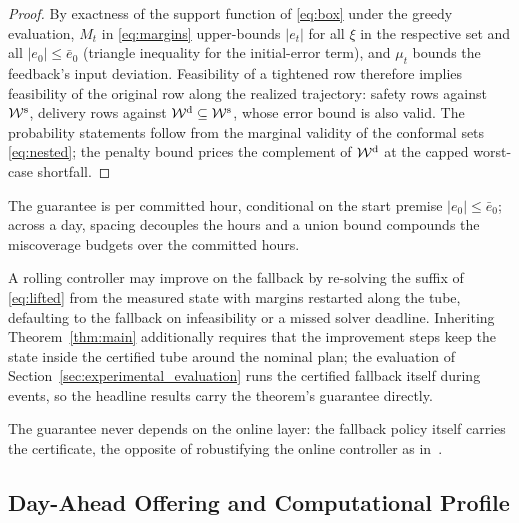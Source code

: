\begin{proof}
By exactness of the support function of \eqref{eq:box} under the greedy
evaluation, $M_t$ in \eqref{eq:margins} upper-bounds $|e_t|$ for all
$\xi$ in the respective set and all $|e_0|\le\bar e_0$ (triangle inequality
for the initial-error term), and $\mu_t$ bounds the feedback's input
deviation. Feasibility of a tightened row therefore implies feasibility of
the original row along the realized trajectory: safety rows against
$\mathcal{W}^{\mathrm{s}}$, delivery rows against $\mathcal{W}^{\mathrm{d}}\subseteq\mathcal{W}^{\mathrm{s}}$, whose error bound is
also valid. The probability statements follow from the marginal validity of
the conformal sets \eqref{eq:nested}; the penalty bound prices the
complement of $\mathcal{W}^{\mathrm{d}}$ at the capped worst-case shortfall.
\end{proof}

The guarantee is per committed hour, conditional on the start premise
$|e_0|\le\bar e_0$; across a day, spacing decouples the hours and a union
bound compounds the miscoverage budgets over the committed hours.

\begin{remark}\label{rem:mpc}
A rolling controller may improve on the fallback by re-solving the suffix of
\eqref{eq:lifted} from the measured state with margins restarted along the
tube, defaulting to the fallback on infeasibility or a missed solver
deadline. Inheriting Theorem~\ref{thm:main} additionally requires that the
improvement steps keep the state inside the certified tube around the
nominal plan; the evaluation of
Section~\ref{sec:experimental_evaluation} runs the certified fallback
itself during events, so the headline results carry the theorem's guarantee
directly.
\end{remark}

The guarantee never depends on the online layer: the fallback policy itself
carries the certificate, the opposite of robustifying the online controller
as in~\cite{shen2026cdro}.

\subsection{Day-Ahead Offering and Computational Profile}
\label{subsec:offering}

